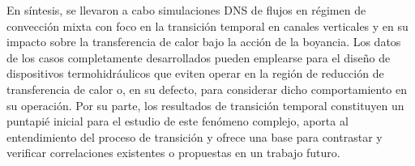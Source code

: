 En síntesis, se llevaron a cabo simulaciones DNS de flujos en régimen de convección mixta con foco en la transición temporal en canales verticales y en su impacto sobre la \linebreak transferencia de calor bajo la acción de la boyancia. Los datos de los casos completamente \linebreak desarrollados pueden emplearse para el diseño de dispositivos termohidráulicos que eviten operar en la región de reducción de transferencia de calor o, en su defecto, para considerar dicho \linebreak comportamiento en su operación. Por su parte, los resultados de transición temporal constituyen un puntapié inicial para el estudio de este fenómeno complejo, aporta al entendimiento del proceso de transición y ofrece una base para contrastar y verificar correlaciones existentes o propuestas en un trabajo futuro.
